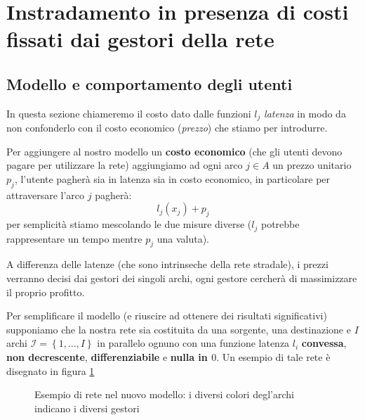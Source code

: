 \documentclass[a4paper]{article}
\theoremstyle{plain}
\theoremstyle{definition}
\theoremstyle{remark}
\newcommand{\set}[1]{\left\{#1\right\}}
\newcommand{\pa}[1]{\left(#1\right)}
\begin{document}
\section{Instradamento in presenza di costi fissati dai gestori della rete}

\subsection{Modello e comportamento degli utenti}
\label{sec:prezzi-modello}

In questa sezione chiameremo il costo dato dalle funzioni $l_j$
\textit{latenza} in modo da non confonderlo con il costo economico
(\textit{prezzo}) che stiamo per introdurre.

Per aggiungere al nostro modello un \textbf{costo economico} (che gli
utenti devono pagare per utilizzare la rete) aggiungiamo ad ogni arco
$j\in A$ un prezzo unitario $p_j$, l'utente pagherà sia in latenza sia
in costo economico, in particolare per attraversare l'arco $j$
pagherà:
\[ l_j\pa{x_j} + p_j \]
per semplicità stiamo mescolando le due misure diverse ($l_j$ potrebbe
rappresentare un tempo mentre $p_j$ una valuta).

A differenza delle latenze (che sono intrinseche della rete stradale),
i prezzi verranno decisi dai gestori dei singoli archi, ogni gestore
cercherà di massimizzare il proprio profitto.

Per semplificare il modello (e riuscire ad ottenere dei risultati
significativi) supponiamo che la nostra rete sia costituita da una
sorgente, una destinazione e $I$ archi $\mathcal{I} = \set{1,...,I}$
in parallelo ognuno con una funzione latenza $l_i$ \textbf{convessa},
\textbf{non decrescente}, \textbf{differenziabile} e \textbf{nulla in
  $0$}. Un esempio di tale rete è disegnato in figura \ref{fig:provider}

\begin{figure}[ht]
  \centering
  \caption{Esempio di rete nel nuovo modello: i diversi colori
    degl'archi indicano i diversi gestori}
  \label{fig:provider}
\end{figure}
\end{document}
